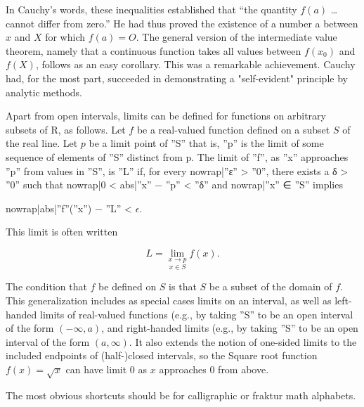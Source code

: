{In Cauchy's words, these inequalities established that ``the quantity
$f(a)$ \ldots cannot differ from zero.'' He had thus proved the existence of a
number a between $x$ and $X$ for which $f(a) = O$. The general version of the
intermediate value theorem, namely that a continuous function takes all
values between $f(x_0)$ and $f(X)$, follows as an easy corollary.
This was a remarkable achievement. Cauchy had, for the most part,
succeeded in demonstrating a "self-evident" principle by analytic methods.


Apart from open intervals, limits can be defined for functions on arbitrary subsets of R, as follows.  Let $f$ be a real-valued function defined on a subset $S$ of the real line.  Let $p$ be a limit point of ''S'' that is, ''p'' is the limit of some sequence of elements of ''S'' distinct from p.  The limit of ''f'', as ''x'' approaches ''p'' from values in ''S'', is ''L'' if, for every {{nowrap|''ε'' > ''0''}}, there exists a δ > ''0'' such that {{nowrap|0 < {{abs|''x'' − ''p''}} < ''δ''}} and {{nowrap|''x'' ∈ ''S''}} implies {{nowrap|{{abs|''f''(''x'') − ''L''}} < $\epsilon$.

This limit is often written

\[
L = \underset{x\in S}{\lim_{x\to p}} f(x).
\]

The condition that $f$ be defined on $S$ is that $S$ be a subset of the domain of $f$.  This generalization includes as special cases limits on an interval, as well as left-handed limits of real-valued functions (e.g., by taking ''S'' to be an open interval of the form $(-\infty,a)$, and right-handed limits (e.g., by taking ''S'' to be an open interval of the form $(a,\infty)$. It also extends the notion of one-sided limits to the included endpoints of (half-)closed intervals, so the Square root function $f(x)=\sqrt{x}$ can have limit 0 as $x$ approaches 0 from above.


The most obvious shortcuts should be for calligraphic or fraktur math alphabets.

\newcommand*{\cA}{\ensuremath{\mathcal{A}}}
\newcommand*{\cB}{\ensuremath{\mathcal{B}}}
\newcommand*{\cC}{\ensuremath{\mathcal{C}}}
\newcommand*{\cD}{\ensuremath{\mathcal{D}}}
\newcommand*{\cE}{\ensuremath{\mathcal{E}}}
\newcommand*{\cF}{\ensuremath{\mathcal{F}}}
\newcommand*{\cG}{\ensuremath{\mathcal{G}}}
\newcommand*{\cH}{\ensuremath{\mathcal{H}}}
\newcommand*{\cI}{\ensuremath{\mathcal{I}}}
\newcommand*{\cJ}{\ensuremath{\mathcal{J}}}
\newcommand*{\cK}{\ensuremath{\mathcal{K}}}
\newcommand*{\cL}{\ensuremath{\mathcal{L}}}
\newcommand*{\cM}{\ensuremath{\mathcal{M}}}
\newcommand*{\cN}{\ensuremath{\mathcal{N}}}
\newcommand*{\cO}{\ensuremath{\mathcal{O}}}
\newcommand*{\cP}{\ensuremath{\mathcal{P}}}
\newcommand*{\cQ}{\ensuremath{\mathcal{Q}}}
\newcommand*{\cR}{\ensuremath{\mathcal{R}}}
\newcommand*{\cS}{\ensuremath{\mathcal{S}}}
\newcommand*{\cT}{\ensuremath{\mathcal{T}}}
\newcommand*{\cU}{\ensuremath{\mathcal{U}}}
\newcommand*{\cV}{\ensuremath{\mathcal{V}}}
\newcommand*{\cW}{\ensuremath{\mathcal{W}}}
\newcommand*{\cX}{\ensuremath{\mathcal{X}}}
\newcommand*{\cY}{\ensuremath{\mathcal{Y}}}
\newcommand*{\cZ}{\ensuremath{\mathcal{Z}}}

}}}
